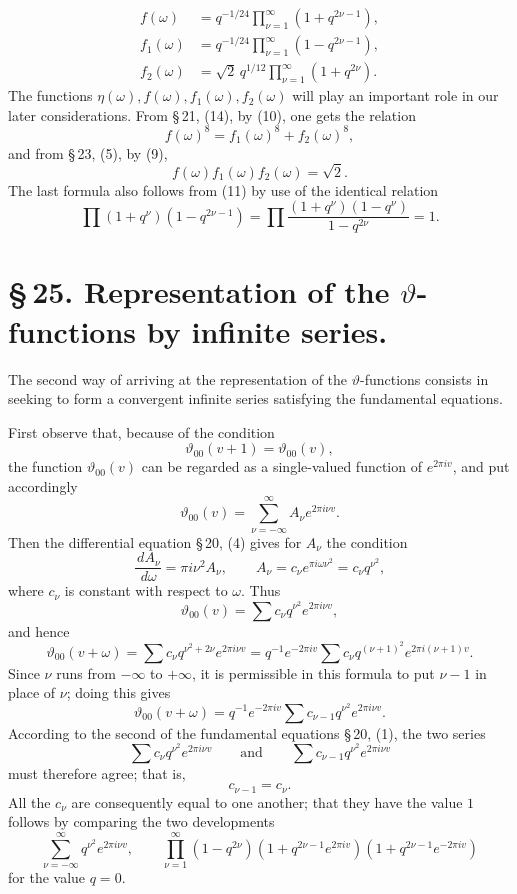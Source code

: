 \documentclass[11pt]{article}
\newcommand{\dd}{\,d}
\newcommand{\tht}{\vartheta}
\begin{document}
\begin{equation}
\begin{aligned}
f(\omega)&=q^{-1/24}\prod_{\nu=1}^{\infty}(1+q^{2\nu-1}),\\
f_1(\omega)&=q^{-1/24}\prod_{\nu=1}^{\infty}(1-q^{2\nu-1}),\\
f_2(\omega)&=\sqrt2\,q^{1/12}\prod_{\nu=1}^{\infty}(1+q^{2\nu}).
\end{aligned}
\tag{11}
\end{equation}
The functions $\eta(\omega), f(\omega), f_1(\omega), f_2(\omega)$ will play an important role in our later considerations. From \S\,21, (14), by (10), one gets the relation
\begin{equation}
f(\omega)^8=f_1(\omega)^8+f_2(\omega)^8,
\tag{12}
\end{equation}
and from \S\,23, (5), by (9),
\begin{equation}
f(\omega)f_1(\omega)f_2(\omega)=\sqrt2.
\tag{13}
\end{equation}
The last formula also follows from (11) by use of the identical relation
\[
\prod(1+q^\nu)(1-q^{2\nu-1})=\prod\frac{(1+q^\nu)(1-q^\nu)}{1-q^{2\nu}}=1.
\]

\section*{\S\,25. Representation of the $\vartheta$-functions by infinite series.}

The second way of arriving at the representation of the $\vartheta$-functions consists in seeking to form a convergent infinite series satisfying the fundamental equations.

First observe that, because of the condition
\[
\tht_{00}(v+1)=\tht_{00}(v),
\]
the function $\tht_{00}(v)$ can be regarded as a single-valued function of $e^{2\pi iv}$, and put accordingly
\[
\tht_{00}(v)=\sum_{\nu=-\infty}^{\infty}A_\nu e^{2\pi i\nu v}.
\]
Then the differential equation \S\,20, (4) gives for $A_\nu$ the condition
\[
\frac{\dd A_\nu}{\dd\omega}=\pi i\nu^2A_\nu,
\qquad
A_\nu=c_\nu e^{\pi i\omega\nu^2}=c_\nu q^{\nu^2},
\]
where $c_\nu$ is constant with respect to $\omega$. Thus
\[
\tht_{00}(v)=\sum c_\nu q^{\nu^2}e^{2\pi i\nu v},
\]
and hence
\[
\tht_{00}(v+\omega)=\sum c_\nu q^{\nu^2+2\nu}e^{2\pi i\nu v}
=q^{-1}e^{-2\pi iv}\sum c_\nu q^{(\nu+1)^2}e^{2\pi i(\nu+1)v}.
\]
Since $\nu$ runs from $-\infty$ to $+\infty$, it is permissible in this formula to put $\nu-1$ in place of $\nu$; doing this gives
\[
\tht_{00}(v+\omega)=q^{-1}e^{-2\pi iv}\sum c_{\nu-1}q^{\nu^2}e^{2\pi i\nu v}.
\]
According to the second of the fundamental equations \S\,20, (1), the two series
\[
\sum c_\nu q^{\nu^2}e^{2\pi i\nu v}\qquad\text{and}\qquad
\sum c_{\nu-1}q^{\nu^2}e^{2\pi i\nu v}
\]
must therefore agree; that is,
\[
c_{\nu-1}=c_\nu.
\]
All the $c_\nu$ are consequently equal to one another; that they have the value $1$ follows by comparing the two developments
\[
\sum_{\nu=-\infty}^{\infty}q^{\nu^2}e^{2\pi i\nu v},\qquad
\prod_{\nu=1}^{\infty}(1-q^{2\nu})(1+q^{2\nu-1}e^{2\pi iv})(1+q^{2\nu-1}e^{-2\pi iv})
\]
for the value $q=0$.
\end{document}
